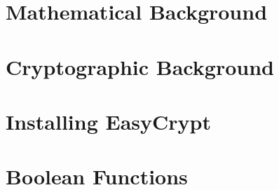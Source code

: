 \documentclass[12pt,openany]{book}
\begin{document}
	
	
	\tableofcontents
	\newpage
	
	
	\newpage
	\chapter{Mathematical Background}
	
	
	\newpage
	\chapter{Cryptographic Background}
	
	
	\newpage
	\chapter{Installing EasyCrypt}
	
		
	\newpage
	\appendix
	\chapter{Boolean Functions}
%	
	
	
		
\end{document}
